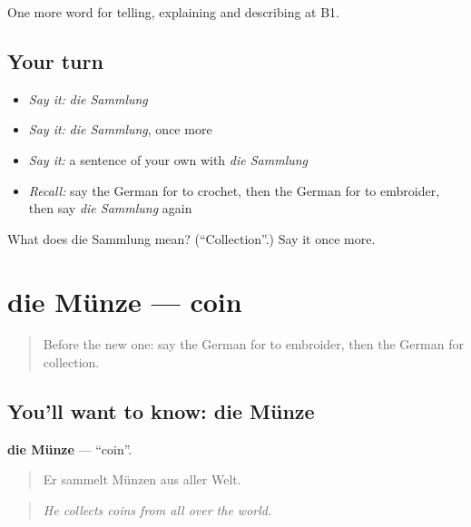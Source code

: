 \begin{grammarlens}[title={What you've built}]
One more word for telling, explaining and describing at B1.
\end{grammarlens}

\subsection*{Your turn}
\begin{itemize}
\raggedright
  \item \emph{Say it:} \emph{die Sammlung}
  \item \emph{Say it:} \emph{die Sammlung}, once more
  \item \emph{Say it:} a sentence of your own with \emph{die Sammlung}
  \item \emph{Recall:} say the German for to crochet, then the German for to embroider, then say \emph{die Sammlung} again
\end{itemize}

\begin{tcolorbox}[breakable,colback=teal!4,colframe=teal!35!black,title={Before you move on}]
What does die Sammlung mean? (\textquotedblleft{}Collection\textquotedblright{}.) Say it once more.
\end{tcolorbox}
\section[die Münze]{die Münze — coin}

\label{lesson:GE-C500-muenze}



\begin{quote}
Before the new one: say the German for to embroider, then the German for collection.
\end{quote}

\subsection*{You'll want to know: die Münze}
\textbf{die Münze} — \textquotedblleft{}coin\textquotedblright{}.

\begin{quote}
Er sammelt Münzen aus aller Welt.
\end{quote}

\begin{quote}
\emph{He collects coins from all over the world.}
\end{quote}


